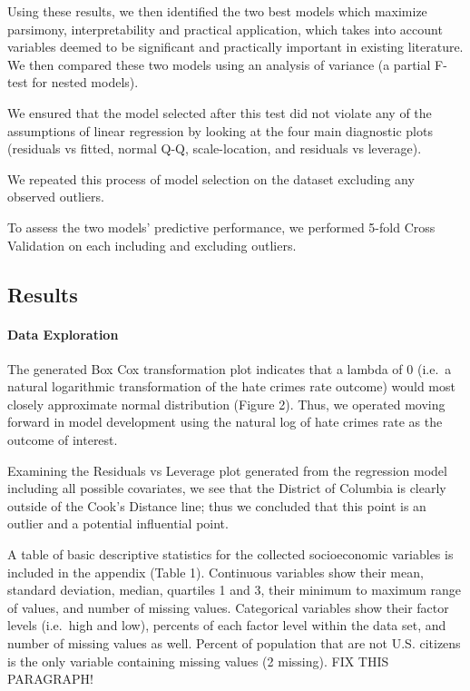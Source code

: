 \documentclass[
]{article}
\begin{document}
Using these results, we then identified the two best models which
maximize parsimony, interpretability and practical application, which
takes into account variables deemed to be significant and practically
important in existing literature. We then compared these two models
using an analysis of variance (a partial F-test for nested models).

We ensured that the model selected after this test did not violate any
of the assumptions of linear regression by looking at the four main
diagnostic plots (residuals vs fitted, normal Q-Q, scale-location, and
residuals vs leverage).

We repeated this process of model selection on the dataset excluding any
observed outliers.

To assess the two models' predictive performance, we performed 5-fold
Cross Validation on each including and excluding outliers.

\hypertarget{results}{%
\subsection{Results}\label{results}}

\hypertarget{data-exploration-1}{%
\paragraph{Data Exploration}\label{data-exploration-1}}

The generated Box Cox transformation plot indicates that a lambda of 0
(i.e.~a natural logarithmic transformation of the hate crimes rate
outcome) would most closely approximate normal distribution (Figure 2).
Thus, we operated moving forward in model development using the natural
log of hate crimes rate as the outcome of interest.

Examining the Residuals vs Leverage plot generated from the regression
model including all possible covariates, we see that the District of
Columbia is clearly outside of the Cook's Distance line; thus we
concluded that this point is an outlier and a potential influential
point.

A table of basic descriptive statistics for the collected socioeconomic
variables is included in the appendix (Table 1). Continuous variables
show their mean, standard deviation, median, quartiles 1 and 3, their
minimum to maximum range of values, and number of missing values.
Categorical variables show their factor levels (i.e.~high and low),
percents of each factor level within the data set, and number of missing
values as well. Percent of population that are not U.S. citizens is the
only variable containing missing values (2 missing). FIX THIS PARAGRAPH!
\end{document}
